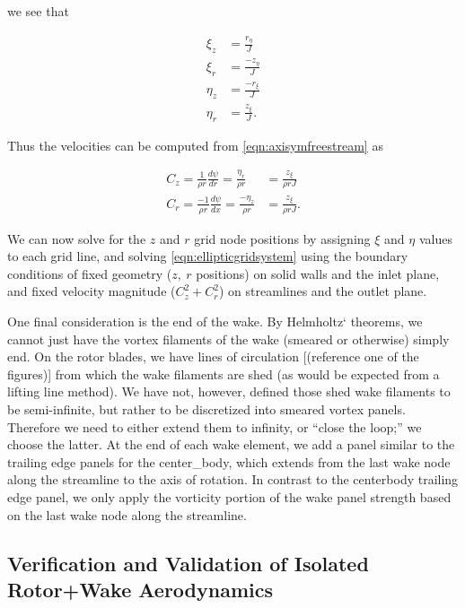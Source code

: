 \noindent we see that

\begin{align}
    \xi_z &= \frac{r_\eta}{J} \\
    \xi_r &= \frac{-z_\eta}{J} \\
    \eta_z &= \frac{-r_\xi}{J} \\
    \eta_r &= \frac{z_\xi}{J}.
\end{align}

\noindent Thus the velocities can be computed from \cref{eqn:axisymfreestream} as

\begin{align}
    C_z = \frac{1}{\rho r} \frac{d\psi}{dr} = \frac{\eta_r}{\rho r} &= \frac{z_\xi}{\rho r J} \\
    C_r = \frac{-1}{\rho r} \frac{d\psi}{dx} = \frac{-\eta_z}{\rho r} &= \frac{z_\xi}{\rho r J}.
\end{align}


We can now solve for the \(z\) and \(r\) grid node positions by assigning \(\xi\) and \(\eta\) values to each grid line, and solving \cref{eqn:ellipticgridsystem} using the boundary conditions of fixed geometry (\(z,~r\) positions) on solid walls and the inlet plane, and fixed velocity magnitude (\(C_z^2+C_r^2\)) on streamlines and the outlet plane.


One final consideration is the end of the wake.
%
By Helmholtz` theorems, we cannot just have the vortex filaments of the wake (smeared or otherwise) simply end.
%
On the rotor blades, we have lines of circulation [(reference one of the figures)] from which the wake filaments are shed (as would be expected from a lifting line method).
%
We have not, however, defined those shed wake filaments to be semi-infinite, but rather to be discretized into smeared vortex panels.
%
Therefore we need to either extend them to infinity, or ``close the loop;'' we choose the latter.
%
At the end of each wake element, we add a panel similar to the trailing edge panels for the center_body, which extends from the last wake node along the streamline to the axis of rotation.
%
In contrast to the centerbody trailing edge panel, we only apply the vorticity portion of the wake panel strength based on the last wake node along the streamline.


\subsection{Verification and Validation of Isolated Rotor+Wake Aerodynamics}
\label{ssec:rwvv}

